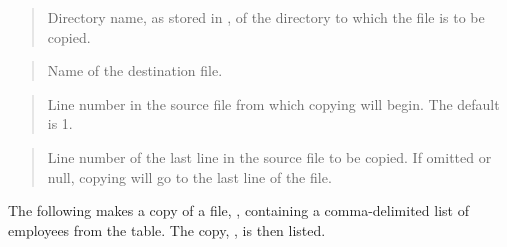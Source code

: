 \documentclass[letterpaper,10pt,english,openany,oneside]{sphinxmanual}
\begin{document}
\begin{quote}

Directory name, as stored in , of the
directory to which the file is to be copied.
\end{quote}

\begin{quote}

Name of the destination file.
\end{quote}

\begin{quote}

Line number in the source file from which copying will begin. The
default is 1.
\end{quote}

\begin{quote}

Line number of the last line in the source file to be copied. If omitted
or null, copying will go to the last line of the file.
\end{quote}


The following makes a copy of a file, ,
containing a comma-delimited list of employees from the  table. The
copy, , is then listed.
\end{document}
